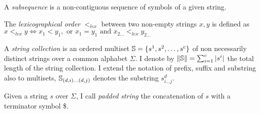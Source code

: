 \begin{definition}
\label{def:subseq}
A \emph{subsequence} is a non-contiguous sequence of symbols of a given string.
\end{definition}


\begin{definition}
\label{def:lex}
The \emph{lexicographical order} $<_{lex}$ between two non-empty strings $x,y$ is defined as $x <_{lex} y \iff x_1 < y_1, \text{ or } x_1 = y_1 \text{ and } x_{2 \dots} <_{lex} y_{2 \dots}$
\end{definition}

\begin{definition}
\label{def:colt}
A \emph{string collection} is an ordered multiset $\mathbb {S} = \{ s^1, s^2, \dots, s^c \}$ of non necessarily distinct strings over a common alphabet $\Sigma$.
I denote by $\left\lVert\mathbb {S}\right\rVert=\sum_{i=1}^{c}{|s^i|}$ the total length of the string collection.
I extend the notation of prefix, suffix and substring also to multisets, \eg $\mathbb {S}_{(d,i) \dots (d,j)}$ denotes the substring $s^d_{i \dots j}$.
\end{definition}


\begin{definition}
\label{def:strd}
Given a string $s$ over $\Sigma$, I call \emph{padded string} the concatenation of $s$ with a terminator symbol \$.
\end{definition}


